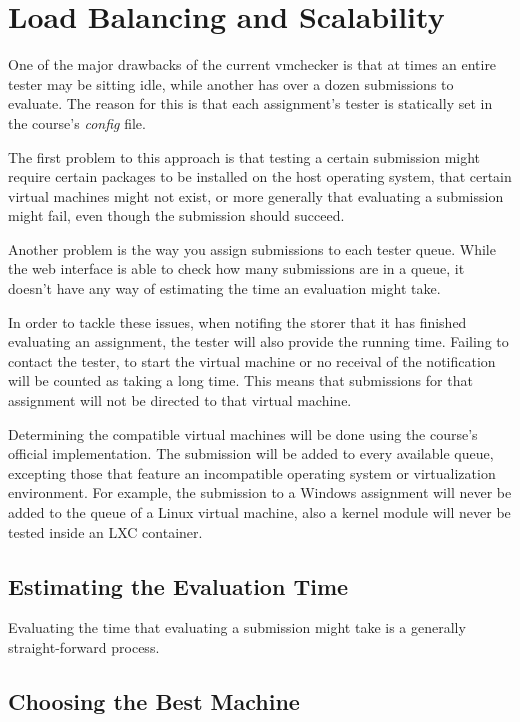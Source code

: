 \chapter{Load Balancing and Scalability}
\label{chapter:virt-load}

One of the major drawbacks of the current vmchecker is that at times an entire
tester may be sitting idle, while another has over a dozen submissions to
evaluate. The reason for this is that each assignment's tester is statically
set in the course's \textit{config} file. 

The first problem to this approach is that testing a certain submission might
require certain packages to be installed on the host operating system, 
that certain virtual machines might not exist, or more generally that
evaluating a submission might fail, even though the submission should
succeed.

Another problem is the way you assign submissions to each tester queue. 
While the web interface is able to check how many submissions are in a queue,
it doesn't have any way of estimating the time an evaluation might take.

In order to tackle these issues, when notifing the storer that it has finished
evaluating an assignment, the tester will also provide the running time. 
Failing to contact the tester, to start the virtual machine or no receival of
the notification will be counted as taking a long time. This means that submissions
for that assignment will not be directed to that virtual machine.

Determining the compatible virtual machines will be done using the course's official
implementation. The submission will be added to every available queue, excepting
those that feature an incompatible operating system or virtualization environment.
For example, the submission to a Windows assignment will never be added to the
queue of a Linux virtual machine, also a kernel module will never be tested 
inside an LXC container.

\section{Estimating the Evaluation Time}
\label{sec:vmc-estimating}

Evaluating the time that evaluating a submission might take is a generally
straight-forward process. 

\section{Choosing the Best Machine}
\label{sec:vmc-best}





